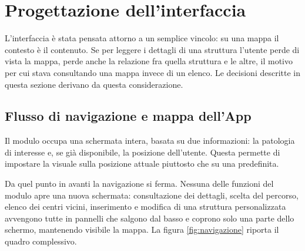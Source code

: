 
\section{Progettazione dell'interfaccia}\label{sec:progettazione-ui-ux}

L'interfaccia è stata pensata attorno a un semplice vincolo: su una mappa il contesto è il contenuto.
Se per leggere i dettagli di una struttura l'utente perde di vista la mappa, perde anche la relazione fra quella struttura
e le altre, il motivo per cui stava consultando una mappa invece di un elenco.
Le decisioni descritte in questa sezione derivano da questa considerazione.

\subsection{Flusso di navigazione e mappa dell'App}\label{subsec:flusso-navigazione}

Il modulo occupa una schermata intera,
basata su due informazioni: la patologia di
interesse e, se già disponibile, la posizione dell'utente.
Questa permette di impostare la visuale sulla posizione attuale piuttosto che su una predefinita.

Da quel punto in avanti la navigazione si ferma.
Nessuna delle funzioni del modulo apre una nuova schermata: consultazione dei dettagli, scelta del percorso, elenco dei
centri vicini, inserimento e modifica di una struttura personalizzata avvengono tutte in pannelli che salgono dal basso e
coprono solo una parte dello schermo, mantenendo visibile la mappa.
La figura \ref{fig:navigazione} riporta il quadro complessivo.

